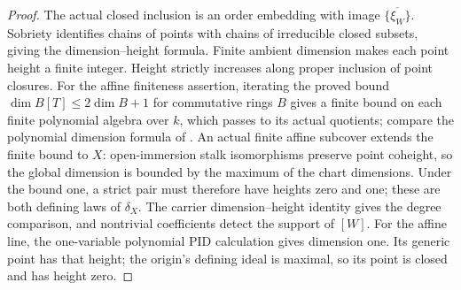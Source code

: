 \documentclass[11pt]{article}
\theoremstyle{definition}
\theoremstyle{remark}
\begin{document}
\begin{proof}
The actual closed inclusion is an order embedding with image
\(\overline{\{\xi_W\}}\). Sobriety identifies chains of points with
chains of irreducible closed subsets, giving the dimension--height
formula. Finite ambient dimension makes each point height a finite
integer. Height strictly increases along proper inclusion of point
closures. For the affine finiteness assertion, iterating the proved
bound \(\dim B[T]\leq2\dim B+1\) for commutative rings \(B\) gives
a finite bound on each
finite polynomial algebra over \(k\), which passes to its actual
quotients; compare the polynomial dimension formula of
\cite{StacksPolynomialDimension}.
An actual finite affine subcover extends the finite bound to \(X\):
open-immersion stalk isomorphisms preserve point coheight, so the
global dimension is bounded by the maximum of the chart dimensions.
Under the bound one, a strict pair must therefore have
heights zero and one; these are both defining laws of \(\delta_X\).
The carrier dimension--height identity gives the degree comparison,
and nontrivial coefficients detect the support of \([W]\).
For the affine line, the one-variable polynomial PID calculation gives
dimension one. Its generic point has that height; the origin's defining
ideal is maximal, so its point is closed and has height zero.
\end{proof}
\end{document}
